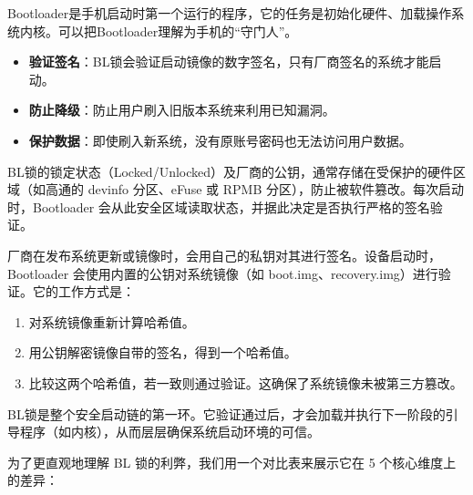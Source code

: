 


Bootloader是手机启动时第一个运行的程序，它的任务是初始化硬件、加载操作系统内核。可以把Bootloader理解为手机的“守门人”。


\begin{itemize}
  \item \textbf{验证签名}：BL锁会验证启动镜像的数字签名，只有厂商签名的系统才能启动。
  \item \textbf{防止降级}：防止用户刷入旧版本系统来利用已知漏洞。
  \item \textbf{保护数据}：即使刷入新系统，没有原账号密码也无法访问用户数据。
\end{itemize}


BL锁的锁定状态（Locked/Unlocked）及厂商的公钥，通常存储在受保护的硬件区域（如高通的 devinfo 分区、eFuse 或 RPMB 分区），防止被软件篡改。每次启动时，Bootloader 会从此安全区域读取状态，并据此决定是否执行严格的签名验证。


厂商在发布系统更新或镜像时，会用自己的私钥对其进行签名。设备启动时，Bootloader 会使用内置的公钥对系统镜像（如 boot.img、recovery.img）进行验证。它的工作方式是：

\begin{enumerate}
  \item 对系统镜像重新计算哈希值。
  \item 用公钥解密镜像自带的签名，得到一个哈希值。
  \item 比较这两个哈希值，若一致则通过验证。这确保了系统镜像未被第三方篡改。
\end{enumerate}


BL锁是整个安全启动链的第一环。它验证通过后，才会加载并执行下一阶段的引导程序（如内核），从而层层确保系统启动环境的可信。


为了更直观地理解 BL 锁的利弊，我们用一个对比表来展示它在 5 个核心维度上的差异：

